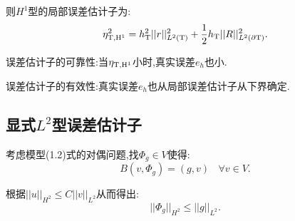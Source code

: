 \documentclass[9pt, a4paper,eqno]{article}
\theoremstyle{plain}
\begin{document}
\begin{CJK}{UTF8}{gkai}
则$H^{1}$型的局部误差估计子为: 
\begin{equation}
\eta _{\rm T , H^{1}}^{2} = h_{\rm T}^{2} ||r||_{L^{2}(\rm T)}^{2} + \dfrac{1}{2} h_{\rm T} ||R||_{L^{2}(\partial \rm T )}^{2}.
\end{equation}

误差估计子的可靠性:当$\eta _{\rm T , H^{1}}$小时,真实误差$e_{h}$也小.

误差估计子的有效性:真实误差$e_{h}$也从局部误差估计子从下界确定.
\subsection{显式$L^{2}$型误差估计子}
考虑模型(1.2)式的对偶问题,找$\Phi_g \in V$使得: 
\begin{equation}
B(v,\Phi _g) = (g,v)~~~~\forall v \in V.
\end{equation}

根据$||u||_{H^2} \leq C ||v||_{L^{2}}$从而得出:
\begin{equation}
||\Phi_g||_{H^2} \leq ||g||_{L^{2}}.
\end{equation}


\end{CJK}
\end{document}
